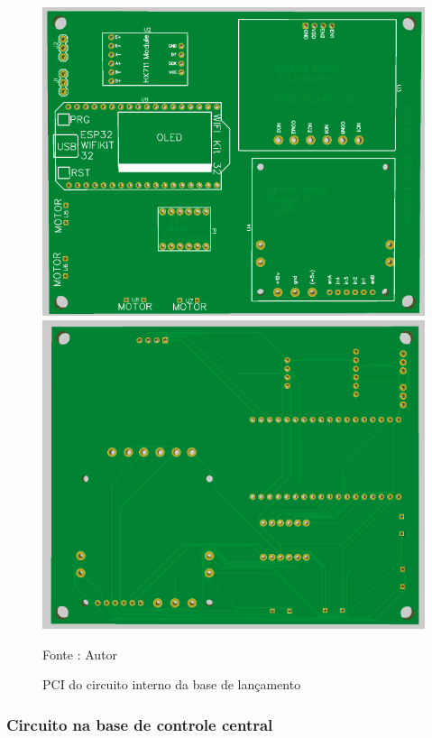 \begin{figure}[H]
  \centering
  \includegraphics[scale=0.3]{figuras/PCB_Base_Lancamento_Front.jpeg}
    \includegraphics[scale=0.3]{figuras/PCB_Base_Lancamento_Back.jpeg}
  \caption{PCI do circuito interno da base de lançamento } 
  {\footnotesize Fonte : Autor } 
  \label{fig:PCB_BASE_LANCAMENTO}
\end{figure}

\subsubsection{Circuito na base de controle central}


